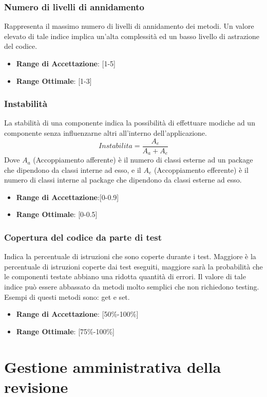\documentclass[12pt,a4paper]{article}
\begin{document}
\subsubsection{Numero di livelli di annidamento}
Rappresenta il massimo numero di livelli di annidamento dei metodi. Un valore elevato di tale indice implica un’alta complessità ed un basso livello di astrazione del codice.
\begin{itemize}
\item \textbf{Range di Accettazione}: [1-5]
\item \textbf{Range Ottimale}: [1-3]
\end{itemize}
\subsubsection{Instabilità}
La stabilità di una componente indica la possibilità di effettuare modiche ad un componente senza influenzarne altri all’interno dell'applicazione.
\[Instabilita=\frac{A_e}{A_a+A_e}\]
Dove $A_a$ (Accoppiamento afferente) è il numero di classi esterne ad un package che dipendono da classi interne ad esso, e il $A_e$ (Accoppiamento efferente) è il numero di classi interne al package che dipendono da classi esterne ad esso.
\begin{itemize}
\item \textbf{Range di Accettazione}:[0-0.9]
\item \textbf{Range Ottimale}: [0-0.5]
\end{itemize}
\subsubsection{Copertura del codice da parte di test}
Indica la percentuale di istruzioni che sono coperte durante i test. Maggiore è la percentuale di istruzioni coperte dai test eseguiti, maggiore sarà la probabilità che le componenti testate abbiano una ridotta quantità di errori. Il valore di tale indice può essere abbassato da metodi molto semplici che non richiedono testing. Esempi di questi metodi sono: get e set.
\begin{itemize}
\item \textbf{Range di Accettazione}: [50\%-100\%]
\item \textbf{Range Ottimale}: [75\%-100\%]
\end{itemize}

\newpage
\section{Gestione amministrativa della revisione}
\end{document}
